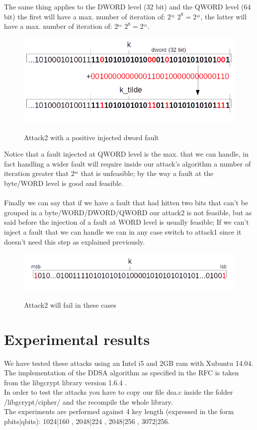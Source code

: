 \documentclass[11pt,english]{article}
\begin{document}
The same thing applies to the DWORD level (32 bit) and the QWORD level (64 bit) the first will have a max. number of iteration of: $2^_{32}$ \cdot $2^{8} = 2^_{40}$, the latter will have a max. number of iteration of: $2^_{64}$ \cdot $2^{8} = 2^_{72}$.

\begin{figure}[H]
\includegraphics[width=1.0\textwidth]{img/attack2dword.png} \\
\caption{\label{f_etichetta}Attack2 with a positive injected dword fault }
\end{figure}

Notice that a fault injected at QWORD level is the max. that we can handle, in fact handling a wider fault will require inside our attack's algorithm a number of iteration greater that $2^_{80}$ that is unfeasible; by the way a fault at the byte/WORD level is good and feasible.\\\\
Finally we can say that if we have a fault that had hitten two bits that can't be grouped in a byte/WORD/DWORD/QWORD our attack2 is not feasible, but as said before the injection of a fault at WORD level is usually feasible; If we can't inject a fault that we can handle we can in any case switch to attack1 since it doesn't need this step as explained previously.

\begin{figure}[H]
\includegraphics[width=1.0\textwidth]{img/attackfail.png} \\
\caption{\label{f_etichetta}Attack2 will fail in these cases }
\end{figure}

\section{Experimental results}
We have tested these attacks using an Intel i5 and 2GB ram with Xubuntu 14.04. 
The implementation of the DDSA algorithm as specified in the RFC\cite{rfc} is taken from the libgcrypt library version 1.6.4 \cite{lib}.\\
In order to test the attacks you have to copy our file dsa.c inside the folder /libgcrypt/cipher/ and the recompile the whole library.
\\The experiments are performed against 4 key length (expressed in the form pbits|qbits): 1024|160 , 2048|224 , 2048|256 , 3072|256.\\
\end{document}
